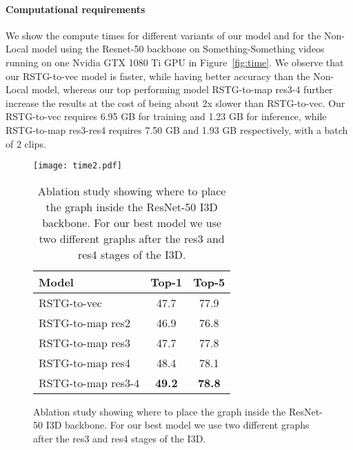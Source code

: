 \documentclass{article}
\begin{document}
\paragraph{Computational requirements}
 We show the compute times for different variants of our model and for the Non-Local model using the Resnet-50 backbone on Something-Something videos running on one Nvidia GTX 1080 Ti GPU in Figure~\ref{fig:time}. We observe that our RSTG-to-vec model is faster, while having better accuracy than the Non-Local model, whereas our top performing model RSTG-to-map res3-4 further increase the results at the cost of being about 2x slower than RSTG-to-vec. Our RSTG-to-vec requires 6.95 GB for training and 1.23 GB for inference, while RSTG-to-map res3-res4 requires 7.50 GB and 1.93 GB respectively, with a batch of 2 clips. 
 

\begin{figure}
    \begin{minipage}[t]{.47\textwidth}
    \centering
\caption{We show running time (clips~/~s) on the left axis and final accuracy on the right axis.}\label{fig:time}
    \texttt{[image: time2.pdf]}
\end{minipage}
\hfill \begin{minipage}[t]{.47\textwidth}
    \vspace{-2mm}
    \begin{table}[H]
        \caption{Ablation study showing where to place the graph inside the ResNet-50 I3D backbone. For our best model we use two different graphs after the res3 and res4 stages of the I3D.}
        \vspace{2mm}
        \centering
        \fontsize{9}{10}\selectfont
        \begin{tabular}{lcc}
            \toprule
            Model & Top-1  & Top-5 \\\midrule
            \midrule
            RSTG-to-vec   & 47.7 & 77.9 \\RSTG-to-map res2   & 46.9 & 76.8 \\RSTG-to-map res3   & 47.7 & 77.8 \\RSTG-to-map res4   & 48.4 & 78.1 \\
            RSTG-to-map res3-4   & \textbf{49.2} & \textbf{78.8} \\\bottomrule
        \end{tabular}
        \label{tab:ablation}
        \end{table}
    
\end{minipage}
\end{figure}
\end{document}
